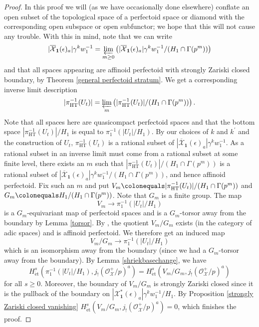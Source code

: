 \documentclass{amsart}
\theoremstyle{remark}
\numberwithin{equation}{subsection}
\newcommand{\cO}{{\mathcal O}}
\newcommand{\cX}{{\mathcal X}}
\newcommand{\HT}{\mathrm{HT}}
\newcommand{\et}{\mathrm{\acute{e}t}}
\newcommand*{\invlim}{\varprojlim}
\newcommand{\mbf}{\mathbf}
\newcommand{\ocX}{\overline{\mathcal{X}}}
\newcommand{\defeq}{\colonequals}
\renewcommand{\(}{\left(}
\renewcommand{\)}{\right)}
\begin{document}
\begin{proof}
In this proof we will (as we have occasionally done elsewhere) conflate an open subset of the topological space of a perfectoid space or diamond with the corresponding open subspace or open subfunctor; we hope that this will not cause any trouble. With this in mind, note that we can write 
\[
 |\ocX_{\mbf{1}}(\epsilon)_{a}|\gamma^{k}w_1^{-1} = \invlim_{m\geq 0} \left( |\ocX_{\mbf{1}}(\epsilon)_{a}|\gamma^{k}w_1^{-1}/(H_1 \cap \Gamma(p^{m})) \right)
\]
and that all spaces appearing are affinoid perfectoid with strongly Zariski closed boundary, by Theorem \ref{general perfectoid stratum}. We get a corresponding inverse limit description
\[
 |\pi^{-1}_{\HT}(U_{t})| = \invlim_{m} \left( |\pi_{\HT}^{-1}(U_{t})|/(H_1\cap \Gamma(p^{m})) \right).
\]
Note that all spaces here are quasicompact perfectoid spaces and that the bottom space $|\pi_{\HT}^{-1}(U_{t})|/H_1$ is equal to $\pi_1^{-1}(|U_{t}|/H_1)$. By our choices of $k$ and $k^{\prime}$ and the construction of $U_{t}$, $\pi_{\HT}^{-1}(U_{t})$ is a rational subset of $|\ocX_{\mbf{1}}(\epsilon)_{a}|\gamma^{k}w_1^{-1}$. As a rational subset in an inverse limit must come from a rational subset at some finite level, there exists an $m$ such that $|\pi_{\HT}^{-1}(U_{t})|/(H_1\cap \Gamma(p^{m}))$ is a rational subset of $|\ocX_{\mbf{1}}(\epsilon)_{a}|\gamma^{k}w_1^{-1}/(H_1 \cap \Gamma(p^{m}))$, and hence affinoid perfectoid. Fix such an $m$ and put $V_{m} \defeq |\pi_{\HT}^{-1}(U_{t})|/(H_1\cap \Gamma(p^{m}))$ and $G_{m} \defeq H_1/(H_1 \cap \Gamma(p^{m}))$. Note that $G_m$ is a finite group. The map
\[
 V_{m} \to \pi_1^{-1}(|U_{t}|/H_1)
 \]
is a $G_{m}$-equivariant map of perfectoid spaces and is a $G_{m}$-torsor away from the boundary by Lemma \ref{torsor}. By \cite[Theorem 1.2, Theorem 3.5]{hansen}, the quotient $V_{m}/G_{m}$ exists (in the category of adic spaces) and is affinoid perfectoid. We therefore get an induced map
\[
 V_{m}/G_{m} \to \pi_1^{-1}(|U_{t}|/H_1) 
 \]
which is an isomorphism away from the boundary (since we had a $G_{m}$-torsor away from the boundary). By Lemma \ref{shriekbasechange}, we have
\[
 H^{s}_{\et}(\pi_1^{-1}(|U_{t}|/H_1), j_{!}(\cO_{\cX}^{+}/p)^{a}) = H^{s}_{\et}(V_{m}/G_{m}, j_{!}(\cO^{+}_{\cX}/p)^{a})
\]
for all $s\geq 0$. Moreover, the boundary of $V_{m}/G_{m}$ is strongly Zariski closed since it is the pullback of the boundary on $|\cX_{\mbf{1}}^{\ast}(\epsilon)_{a}|\gamma^{k}w_1^{-1}/H_1$. By Proposition \ref{strongly Zariski closed vanishing} $H^{s}_{\et}(V_{m}/G_{m}, j_{!}(\cO^{+}_{\cX}/p)^{a})=0$, which finishes the proof.
\end{proof}
\end{document}
